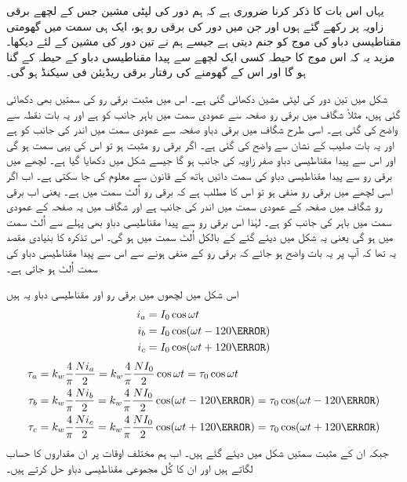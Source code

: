یہاں اس بات کا ذکر کرنا ضروری ہے کہ ہم  دور کی لپٹی مشین جس کے لچھے  برقی زاویہ پر رکھے گئے ہوں اور جن میں  دور کی برقی رو  ہو، ایک ہی سمت میں گھومتی مقناطیسی دباو کی موج کو جنم دیتی ہے جیسے ہم نے تین دور کی مشین کے لئے دیکھا۔ مزید یہ کہ اس موج کا حیطہ کسی ایک لچھے سے پیدا مقناطیسی دباو کے حیطہ  کے   گنا ہو گا اور اس کے گھومنے کی رفتار  برقی ریڈیئن فی سیکنڈ ہو گی۔

شکل   میں تین دور کی لپٹی مشین دکھائی گئی ہے۔ اس میں مثبت برقی رو کی سمتیں بھی دکھائی گئی ہیں، مثلاً  شگاف میں برقی رو صفحہ سے عمودی سمت میں باہر جانب کو ہے اور یہ بات نقطہ سے واضح کی گئی ہے۔ اسی طرح  شگاف میں برقی دباو صفحہ سے عمودی سمت میں اندر کی جانب کو ہے اور یہ بات صلیب کے نشان سے واضح کی گئی ہے۔ اگر برقی رو مثبت ہو تو اس کی یہی سمت ہو گی اور اس سے پیدا مقناطیسی دباو  صفر زاویہ کی جانب ہو گا جیسے شکل میں دکھایا گیا ہے۔ لچھے میں برقی رو سے پیدا مقناطیسی دباو کی سمت دائیں ہاتھ کے قانون سے معلوم کی جا سکتی ہے۔ اب اگر اسی لچھے میں برقی رو منفی ہو تو اس کا مطلب ہے کہ برقی رو اُلٹ سمت میں ہے۔ یعنی اب برقی رو  شگاف میں صفحہ کے عمودی سمت میں اندر کی جانب ہے اور  شگاف میں یہ صفحہ کے عمودی سمت میں باہر کی جانب کو ہے۔ لہٰذا اس برقی رو سے پیدا مقناطیسی دباو بھی پہلے سے اُلٹ سمت میں ہو گی یعنی یہ شکل میں دیئے گئے    کے بالکل اُلٹ سمت میں ہو گی۔ اس تذکرہ کا بنیادی مقصد یہ تھا کہ آپ پر یہ بات واضح ہو جائے کہ برقی رو کے منفی ہونے سے اس سے پیدا مقناطیسی دباو کی سمت اُلٹ ہو جاتی ہے۔

اس شکل میں لچھوں میں برقی رو اور مقناطیسی دباو یہ ہیں
\begin{gather}
\begin{aligned}\label{مساوات_گھومتے_مشین_تین_دور_برقی_رو}
i_a&=I_0 \cos \omega t\\
i_b&=I_0 \cos (\omega t-120\degree)\\
i_c&=I_0 \cos (\omega t+120\degree)
\end{aligned}
\end{gather}
%
\begin{gather}
\begin{aligned}\label{مساوات_گھومتے_مشین_تین_دور_دباو}
\tau_a&=k_w \frac{4}{\pi}\frac{N i_a}{2}=k_w \frac{4}{\pi}\frac{N I_0}{2} \cos \omega t=\tau_0 \cos \omega t\\
\tau_b&=k_w \frac{4}{\pi}\frac{N i_b}{2}=k_w \frac{4}{\pi}\frac{N I_0}{2} \cos (\omega t-120\degree)=\tau_0 \cos (\omega t-120\degree)\\
\tau_c&=k_w \frac{4}{\pi}\frac{N i_c}{2}=k_w \frac{4}{\pi}\frac{N I_0}{2} \cos (\omega t+120\degree)=\tau_0 \cos (\omega t+120\degree)
\end{aligned}
\end{gather}
جبکہ ان کے مثبت سمتیں شکل میں دیئے گئے ہیں۔ اب ہم مختلف اوقات پر ان مقداروں کا حساب لگاتے ہیں اور ان کا کُل مجموعی مقناطیسی دباو حل کرتے ہیں۔

